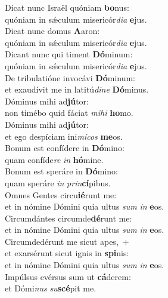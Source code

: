 \evenverse Dicat nunc Israël quóniam \textbf{bo}nus:~\*\\
\evenverse quóniam in sǽculum misericór\textit{di}\textit{a} \textbf{e}jus.\\
\oddverse Dicat nunc domus \textbf{A}aron:~\*\\
\oddverse quóniam in sǽculum misericór\textit{di}\textit{a} \textbf{e}jus.\\
\evenverse Dicant nunc qui timent \textbf{Dó}minum:~\*\\
\evenverse quóniam in sǽculum misericór\textit{di}\textit{a} \textbf{e}jus.\\
\oddverse De tribulatióne invocávi \textbf{Dó}minum:~\*\\
\oddverse et exaudívit me in latitú\textit{di}\textit{ne} \textbf{Dó}minus.\\
\evenverse Dóminus mihi ad\textbf{jú}tor:~\*\\
\evenverse non timébo quid fáciat \textit{mi}\textit{hi} \textbf{ho}mo.\\
\oddverse Dóminus mihi ad\textbf{jú}tor:~\*\\
\oddverse et ego despíciam ini\textit{mí}\textit{cos} \textbf{me}os.\\
\evenverse Bonum est confídere in \textbf{Dó}mino:~\*\\
\evenverse quam confíde\textit{re} \textit{in} \textbf{hó}mine.\\
\oddverse Bonum est speráre in \textbf{Dó}mino:~\*\\
\oddverse quam speráre \textit{in} \textit{prin}\textbf{cí}pibus.\\
\evenverse Omnes Gentes circu\textbf{ié}runt me:~\*\\
\evenverse et in nómine Dómini quia ultus \textit{sum} \textit{in} \textbf{e}os.\\
\oddverse Circumdántes circumde\textbf{dé}runt me:~\*\\
\oddverse et in nómine Dómini quia ultus \textit{sum} \textit{in} \textbf{e}os.\\
\evenverse Circumdedérunt me sicut apes,~+\\
\evenverse  et exarsérunt sicut ignis in \textbf{spi}nis:~\*\\
\evenverse et in nómine Dómini quia ultus \textit{sum} \textit{in} \textbf{e}os.\\
\oddverse Impúlsus evérsus sum ut \textbf{cá}derem:~\*\\
\oddverse et Dómi\textit{nus} \textit{su}\textbf{scé}pit me.\\
